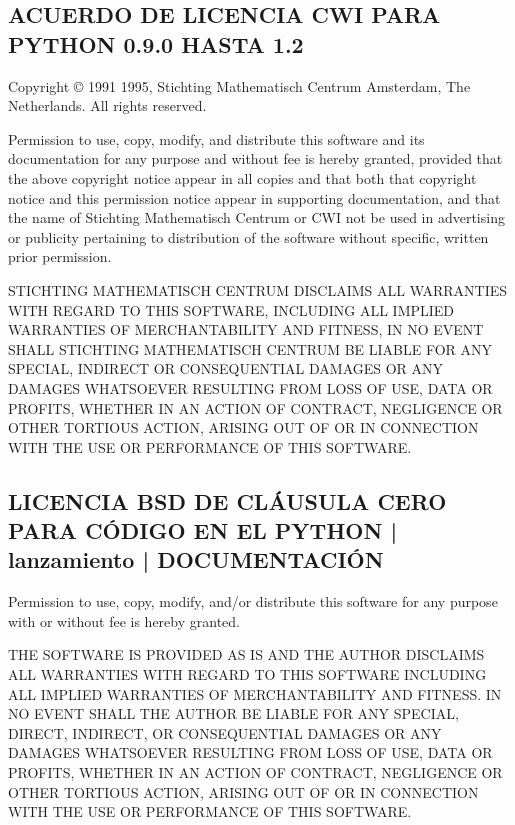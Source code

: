\documentclass[a4,10pt,spanish]{sphinxmanual}
\begin{document}
\subsection{ACUERDO DE LICENCIA CWI PARA PYTHON 0.9.0 HASTA 1.2}
\label{\detokenize{license:cwi-license-agreement-for-python-0-9-0-through-1-2}}
\begin{sphinxVerbatim}[commandchars=\\\{\}]
Copyright © 1991 \PYGZhy{} 1995, Stichting Mathematisch Centrum Amsterdam, The
Netherlands.  All rights reserved.

Permission to use, copy, modify, and distribute this software and its
documentation for any purpose and without fee is hereby granted, provided that
the above copyright notice appear in all copies and that both that copyright
notice and this permission notice appear in supporting documentation, and that
the name of Stichting Mathematisch Centrum or CWI not be used in advertising or
publicity pertaining to distribution of the software without specific, written
prior permission.

STICHTING MATHEMATISCH CENTRUM DISCLAIMS ALL WARRANTIES WITH REGARD TO THIS
SOFTWARE, INCLUDING ALL IMPLIED WARRANTIES OF MERCHANTABILITY AND FITNESS, IN NO
EVENT SHALL STICHTING MATHEMATISCH CENTRUM BE LIABLE FOR ANY SPECIAL, INDIRECT
OR CONSEQUENTIAL DAMAGES OR ANY DAMAGES WHATSOEVER RESULTING FROM LOSS OF USE,
DATA OR PROFITS, WHETHER IN AN ACTION OF CONTRACT, NEGLIGENCE OR OTHER TORTIOUS
ACTION, ARISING OUT OF OR IN CONNECTION WITH THE USE OR PERFORMANCE OF THIS
SOFTWARE.
\end{sphinxVerbatim}


\subsection{LICENCIA BSD DE CLÁUSULA CERO PARA CÓDIGO EN EL PYTHON | lanzamiento | DOCUMENTACIÓN}
\label{\detokenize{license:zero-clause-bsd-license-for-code-in-the-python-release-documentation}}\label{\detokenize{license:bsd0}}
\begin{sphinxVerbatim}[commandchars=\\\{\}]
Permission to use, copy, modify, and/or distribute this software for any
purpose with or without fee is hereby granted.

THE SOFTWARE IS PROVIDED \PYGZdq{}AS IS\PYGZdq{} AND THE AUTHOR DISCLAIMS ALL WARRANTIES WITH
REGARD TO THIS SOFTWARE INCLUDING ALL IMPLIED WARRANTIES OF MERCHANTABILITY
AND FITNESS. IN NO EVENT SHALL THE AUTHOR BE LIABLE FOR ANY SPECIAL, DIRECT,
INDIRECT, OR CONSEQUENTIAL DAMAGES OR ANY DAMAGES WHATSOEVER RESULTING FROM
LOSS OF USE, DATA OR PROFITS, WHETHER IN AN ACTION OF CONTRACT, NEGLIGENCE OR
OTHER TORTIOUS ACTION, ARISING OUT OF OR IN CONNECTION WITH THE USE OR
PERFORMANCE OF THIS SOFTWARE.
\end{sphinxVerbatim}
\end{document}

